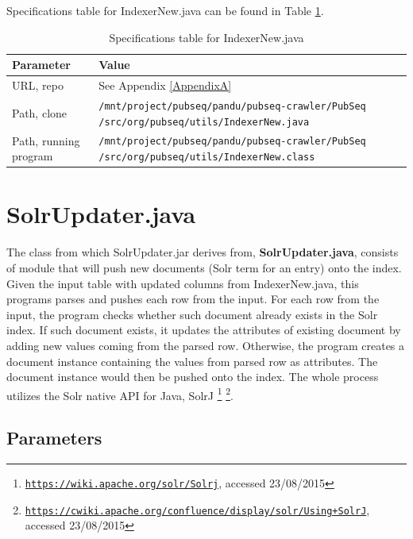 Specifications table for IndexerNew.java can be found in Table \ref{tab:IndexerNew}.

\begin{table}[htbp]
\caption{Specifications table for IndexerNew.java}
\centering
\begin{tabularx}{\textwidth}{ | l | X | }
  \hline
  Parameter & Value \\
  \hline
  URL, repo & See Appendix \ref{AppendixA} \\
  Path, clone & \texttt{/mnt/project/pubseq/pandu/pubseq-crawler/PubSeq /src/org/pubseq/utils/IndexerNew.java} \\
  Path, running program & \texttt{/mnt/project/pubseq/pandu/pubseq-crawler/PubSeq /src/org/pubseq/utils/IndexerNew.class}\\
  \hline
\end{tabularx}
\label{tab:IndexerNew}
\end{table}


\section{SolrUpdater.java}

The class from which SolrUpdater.jar derives from, \textbf{SolrUpdater.java}, consists of module that will push new documents (Solr term for an entry) onto the index. Given the input table with updated columns from IndexerNew.java, this programs parses and pushes each row from the input. For each row from the input, the program checks whether such document already exists in the Solr index. If such document exists, it updates the attributes of existing document by adding new values coming from the parsed row. Otherwise, the program creates a document instance containing the values from parsed row as attributes. The document instance would then be pushed onto the index. The whole process utilizes the Solr native API for Java, SolrJ \citep{grainger2014solr} \footnote{\href{https://wiki.apache.org/solr/Solrj}{\texttt{https://wiki.apache.org/solr/Solrj}}, accessed 23/08/2015} \footnote{\href{https://cwiki.apache.org/confluence/display/solr/Using+SolrJ}{\texttt{https://cwiki.apache.org/confluence/display/solr/Using+SolrJ}}, accessed 23/08/2015}.

\subsection{Parameters}

